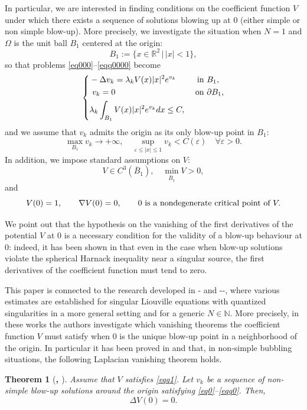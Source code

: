 \documentclass[reqno,11pt]{amsart}
\newtheorem{thm}{Theorem}[section]
\theoremstyle{definition}
\numberwithin{equation}{section}
\newcommand{\N}{\mathbb{N}}
\newcommand{\D}{\Delta}
\newcommand{\R}{\mathbb{R}}
\newcommand{\la}{\lambda}
\newcommand{\e}{\varepsilon}
\renewcommand{\(}{\left(}
\renewcommand{\)}{\right)}
\renewcommand{\[}{\left[}
\renewcommand{\]}{\right]}
\newcommand{\beq}{\begin{equation}}
\newcommand{\eeq}{\end{equation}}
\begin{document}
In particular, we are interested in finding 
conditions on the  coefficient function
 $V$
under which there exists a sequence of solutions   blowing up at $0$ (either simple or non simple blow-up). More precisely, we investigate the situation when 
 $N=1$ and  $\Omega$ is the unit ball $B_1$ centered at the origin:
$$B_1:=\{x\in\R^2\,|\, |x|<1\} ,$$
so that problems \eqref{eq000}--\eqref{eqq0000} become
\begin{equation}\label{eq0}
  \left\{
      \begin{aligned}&- \D v_k = \la_k V(x) |x|^{2} e^{v_k}&  \hbox{ in }&  B_1,\\
    &  \ v_k=0 &  \hbox{ on }& \partial B_1,\\ &\lambda_k \int_{B_1}V(x) |x|^{2}e^{v_k} dx \leq C,
  \end{aligned}
    \right. \end{equation}
and we assume that $v_k$  admits the origin as its only blow-up point in $B_1$: \beq\label{eqq0}\max_{B_1}v_k\to +\infty, \quad \sup_{\e\leq |x|\leq 1}v_k<C(\e)\quad \forall \e>0.\eeq
In addition, we impose standard assumptions on $V$:\beq\label{eqq1} V\in C^3(\overline B_1), \quad \min_{\overline B_1}V>0,\eeq
and 
\beq\label{eqq2} V(0)=1,\qquad \nabla V(0)=0, \qquad 0 \hbox{ is a nondegenerate critical point of } V.\eeq 

We point out that the hypothesis on the vanishing of the first derivatives of the potential $V$ at $0$  is a necessary condition for the validity of  a blow-up behaviour at $0$: indeed,   it has been shown in \cite{WeiZhang1}  that  even in the case when 
 blow-up solutions violate the
spherical Harnack inequality 
near a singular source, the first derivatives of the coefficient function must tend to zero. 

This paper is connected to the research developed in  \cite{WeiZhang3}-\cite{WeiZhang4} and \cite{WeiZhang}-\cite{WeiZhang1}-\cite{WeiZhang2}, where various estimates are established for  singular Liouville equations with quantized singularities in a more general setting and for a generic $N\in\N$.  More precisely, in these works  the authors investigate which vanishing theorems the coefficient function 
$V$ must satisfy when  $0$  is the unique blow-up point in a neighborhood of the origin. In particular it has been proved in \cite{WeiZhang4} and \cite{WeiZhang2} that, in non-simple bubbling situations, the following Laplacian vanishing theorem holds.

\begin{thm}[\bf{\cite{WeiZhang4}, \cite{WeiZhang2}}]\label{thweizhang} Assume that 
$V$ satisfies \eqref{eqq1}. Let $v_k$  be a sequence of non-simple blow-up solutions around the origin satisfying \eqref{eq0}--\eqref{eqq0}.  Then,
$$\Delta V(0)=0.
$$
\end{thm}
\end{document}
